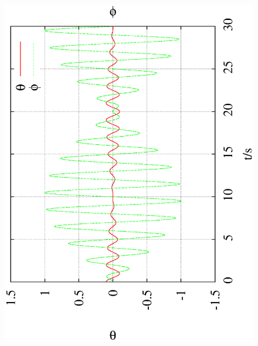 \documentclass[10pt,a4paper]{article}
\begin{document}
\begin{figure}[h!]
\begin{center}
\includegraphics[scale = 0.2, angle =-90]{0.001_0_0.01_theta_phi.eps}

\end{center}
\end{figure}
\end{document}
